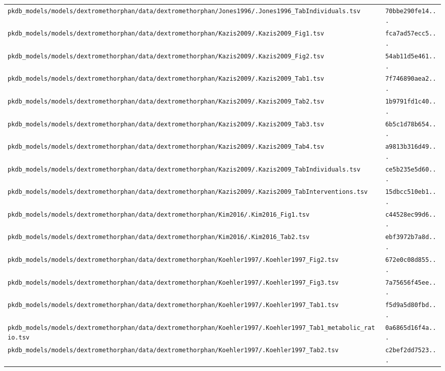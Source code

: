 \begin{longtable}{ll}
\texttt{pkdb\_models/models/dextromethorphan/data/dextromethorphan/Jones1996/.Jones1996\_TabIndividuals.tsv} & \texttt{70bbe290fe14...} \\
\texttt{pkdb\_models/models/dextromethorphan/data/dextromethorphan/Kazis2009/.Kazis2009\_Fig1.tsv} & \texttt{fca7ad57ecc5...} \\
\texttt{pkdb\_models/models/dextromethorphan/data/dextromethorphan/Kazis2009/.Kazis2009\_Fig2.tsv} & \texttt{54ab11d5e461...} \\
\texttt{pkdb\_models/models/dextromethorphan/data/dextromethorphan/Kazis2009/.Kazis2009\_Tab1.tsv} & \texttt{7f746890aea2...} \\
\texttt{pkdb\_models/models/dextromethorphan/data/dextromethorphan/Kazis2009/.Kazis2009\_Tab2.tsv} & \texttt{1b9791fd1c40...} \\
\texttt{pkdb\_models/models/dextromethorphan/data/dextromethorphan/Kazis2009/.Kazis2009\_Tab3.tsv} & \texttt{6b5c1d78b654...} \\
\texttt{pkdb\_models/models/dextromethorphan/data/dextromethorphan/Kazis2009/.Kazis2009\_Tab4.tsv} & \texttt{a9813b316d49...} \\
\texttt{pkdb\_models/models/dextromethorphan/data/dextromethorphan/Kazis2009/.Kazis2009\_TabIndividuals.tsv} & \texttt{ce5b235e5d60...} \\
\texttt{pkdb\_models/models/dextromethorphan/data/dextromethorphan/Kazis2009/.Kazis2009\_TabInterventions.tsv} & \texttt{15dbcc510eb1...} \\
\texttt{pkdb\_models/models/dextromethorphan/data/dextromethorphan/Kim2016/.Kim2016\_Fig1.tsv} & \texttt{c44528ec99d6...} \\
\texttt{pkdb\_models/models/dextromethorphan/data/dextromethorphan/Kim2016/.Kim2016\_Tab2.tsv} & \texttt{ebf3972b7a8d...} \\
\texttt{pkdb\_models/models/dextromethorphan/data/dextromethorphan/Koehler1997/.Koehler1997\_Fig2.tsv} & \texttt{672e0c08d855...} \\
\texttt{pkdb\_models/models/dextromethorphan/data/dextromethorphan/Koehler1997/.Koehler1997\_Fig3.tsv} & \texttt{7a75656f45ee...} \\
\texttt{pkdb\_models/models/dextromethorphan/data/dextromethorphan/Koehler1997/.Koehler1997\_Tab1.tsv} & \texttt{f5d9a5d80fbd...} \\
\texttt{pkdb\_models/models/dextromethorphan/data/dextromethorphan/Koehler1997/.Koehler1997\_Tab1\_metabolic\_ratio.tsv} & \texttt{0a6865d16f4a...} \\
\texttt{pkdb\_models/models/dextromethorphan/data/dextromethorphan/Koehler1997/.Koehler1997\_Tab2.tsv} & \texttt{c2bef2dd7523...} \\

\end{longtable}
